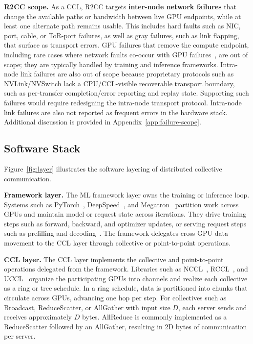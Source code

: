 \smallskip\noindent\textbf{R2CC scope.}
As a CCL, R2CC targets \textbf{inter-node network failures} that change the available paths or bandwidth between live GPU endpoints, while at least one alternate path remains usable. This includes hard faults such as NIC, port, cable, or ToR-port failures, as well as gray failures, such as link flapping, that surface as transport errors. GPU failures that remove the compute endpoint, including rare cases where network faults co-occur with GPU failures~\cite{Revisiting_Reliability}, are out of scope; they are typically handled by training and inference frameworks. Intra-node link failures are also out of scope because proprietary protocols such as NVLink/NVSwitch lack a CPU/CCL-visible recoverable transport boundary, such as per-transfer completion/error reporting and replay state. Supporting such failures would require redesigning the intra-node transport protocol. Intra-node link failures are also not reported as frequent errors in the hardware stack. Additional discussion is provided in Appendix~\ref{app:failure-scope}.

\subsection{Software Stack}
\label{sec:bg-failures}
Figure~\ref{fig:layer} illustrates the software layering of distributed collective communication.

\smallskip\noindent\textbf{Framework layer.}
The ML framework layer owns the training or inference loop. Systems such as PyTorch~\cite{paszke2019pytorch}, DeepSpeed~\cite{rasley2020deepspeed}, and Megatron~\cite{shoeybi2019megatron} partition work across GPUs and maintain model or request state across iterations. They drive training steps such as forward, backward, and optimizer updates, or serving request steps such as prefilling and decoding~\cite{kwon2023efficient,agrawal2024taming,zhong2024distserve}. The framework delegates cross-GPU data movement to the CCL layer through collective or point-to-point operations.

\smallskip\noindent\textbf{CCL layer.}
The CCL layer implements the collective and point-to-point operations delegated from the framework. Libraries such as NCCL~\cite{NCCL}, RCCL~\cite{RCCL}, and UCCL~\cite{zhou2025extensible} organize the participating GPUs into channels and realize each collective as a ring or tree schedule. In a ring schedule, data is partitioned into chunks that circulate across GPUs, advancing one hop per step. For collectives such as Broadcast, ReduceScatter, or AllGather with input size $D$, each server sends and receives approximately $D$ bytes. AllReduce is commonly implemented as a ReduceScatter followed by an AllGather, resulting in 2D bytes of communication per server.


